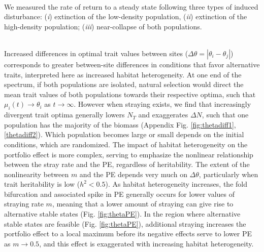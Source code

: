 \documentclass[twocolumn,preprintnumbers,amsmath,amssymb,superscriptaddress]{revtex4}
\begin{document}
\\ 
We measured the rate of return to a steady state following three types of induced disturbance: (\emph{i}) extinction of the low-density population, (\emph{ii}) extinction of the high-density population; (\emph{iii}) near-collapse of both populations.












\\ 
\noindent Increased differences in optimal trait values between sites ($\Delta\theta = \left|\theta_i - \theta_j\right|$) corresponds to greater between-site differences in conditions that favor alternative traits, interpreted here as increased habitat heterogeneity.
At one end of the spectrum, if both populations are isolated, natural selection would direct the mean trait values of both populations towards their respective optima, such that $\mu_i(t) \rightarrow \theta_i$ as $t\rightarrow\infty$.
However when straying exists, we find that increasingly divergent trait optima generally lowers $N_T$ and exaggerates $\Delta N$, such that one population has the majority of the biomass (Appendix Fig. \ref{fig:thetadiff1},\ref{thetadiff2}).
Which population becomes large or small depends on the initial conditions, which are randomized. 
The impact of habitat heterogeneity on the portfolio effect is more complex, serving to emphasize the nonlinear relationship between the stray rate and the PE, regardless of heritability.
The extent of the nonlinearity between $m$ and the PE depends very much on $\Delta\theta$, particularly when trait heritability is low ($h^2<0.5$).
As habitat heterogeneity increases, the fold bifurcation and associated spike in PE generally occurs for lower values of straying rate $m$, meaning that a lower amount of straying can give rise to alternative stable states (Fig. \ref{fig:thetaPE}).
In the region where alternative stable states are feasible (Fig. \ref{fig:thetaPE}), additional straying increases the portfolio effect to a local maximum before its negative effects serve to lower PE as $m\rightarrow 0.5$, and this effect is exaggerated with increasing habitat heterogeneity.
\\
\end{document}
